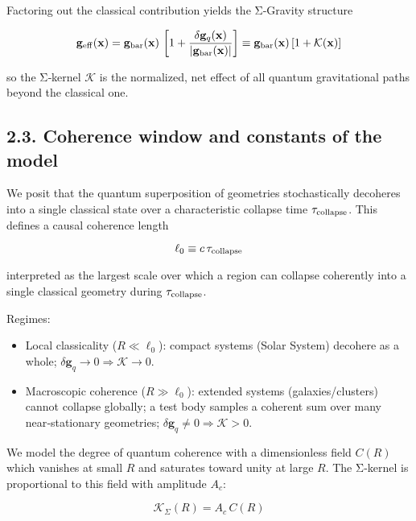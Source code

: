 \documentclass[11pt,a4paper]{article}
\begin{document}
Factoring out the classical contribution yields the Σ‑Gravity structure


\begin{equation}
\mathbf{g}_{\rm eff}(\mathbf{x}) = \mathbf{g}_{\rm bar}(\mathbf{x})\,\left[1 + \frac{\delta\mathbf{g}_q(\mathbf{x})}{\lvert\mathbf{g}_{\rm bar}(\mathbf{x})\rvert}\right] \equiv \mathbf{g}_{\rm bar}(\mathbf{x})\,[1+\mathcal{K}(\mathbf{x})]
\end{equation}


so the Σ‑kernel $\mathcal{K}$ is the normalized, net effect of all quantum gravitational paths beyond the classical one.


\subsection{2.3. Coherence window and constants of the model}


We posit that the quantum superposition of geometries stochastically decoheres into a single classical state over a characteristic collapse time $\tau_{\rm collapse}$. This defines a causal coherence length


\begin{equation}
\ell_0 \equiv c\,\tau_{\rm collapse}
\end{equation}


interpreted as the largest scale over which a region can collapse coherently into a single classical geometry during $\tau_{\rm collapse}$.


Regimes:

\begin{itemize}
\item Local classicality ($R\ll\ell_0$): compact systems (Solar System) decohere as a whole; $\delta\mathbf{g}_q\to0\Rightarrow \mathcal{K}\to0$.
\item Macroscopic coherence ($R\gg\ell_0$): extended systems (galaxies/clusters) cannot collapse globally; a test body samples a coherent sum over many near‑stationary geometries; $\delta\mathbf{g}_q\ne0\Rightarrow \mathcal{K}>0$.
\end{itemize}


We model the degree of quantum coherence with a dimensionless field $C(R)$ which vanishes at small $R$ and saturates toward unity at large $R$. The Σ‑kernel is proportional to this field with amplitude $A_c$:


\begin{equation}
\mathcal{K}_\Sigma(R) = A_c\,C(R)
\end{equation}
\end{document}
